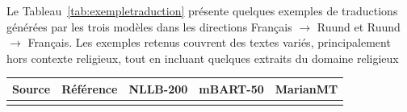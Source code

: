 Le Tableau~\ref{tab:exempletraduction} présente quelques exemples de traductions générées par les trois modèles dans les directions Français $\rightarrow$ Ruund et Ruund $\rightarrow$ Français. Les exemples retenus couvrent des textes variés, principalement hors contexte religieux, tout en incluant quelques extraits du domaine religieux\begin{landscape}
\begingroup
\renewcommand{\arraystretch}{1.4}
\small
{}
\begin{longtable}{p{4.5cm}p{4.5cm}p{4.5cm}p{4.5cm}p{4.5cm}}
\toprule
\textbf{Source} & \textbf{Référence} & \textbf{\ac{NLLB}-200} & \textbf{\ac{mBART}-50} & \textbf{\ac{MarianMT}} \\
\midrule
\endfirsthead
\endhead

\bottomrule
\endfoot


\end{longtable}
\end{landscape}
